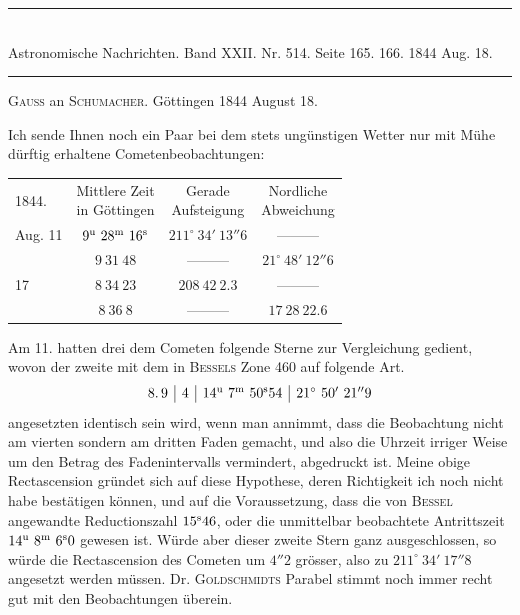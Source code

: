 \clearpage
{}
\hypertarget{native-472-lower}{}
\begin{center}
\rule{0.55\linewidth}{0.4pt}\\[2pt]
Astronomische Nachrichten. Band XXII. Nr. 514. Seite 165. 166. 1844 Aug. 18.\\[2pt]
\rule{0.55\linewidth}{0.4pt}
\end{center}
\begin{center}\textsc{Gauss} an \textsc{Schumacher}. Göttingen 1844 August 18.\end{center}

Ich sende Ihnen noch ein Paar bei dem stets ungünstigen Wetter nur mit Mühe dürftig erhaltene Cometenbeobachtungen:

\begin{center}
\setlength{\tabcolsep}{4pt}
\begin{tabular}{lccc}
1844. & \shortstack{Mittlere Zeit\\in Göttingen} & \shortstack{Gerade\\Aufsteigung} & \shortstack{Nordliche\\Abweichung} \\
Aug. 11 & $9^{\rm u}\ 28^{\rm m}\ 16^{\rm s}$ & $211^\circ\ 34'\ 13''6$ & ---\quad ---\quad --- \\
 & $9\ 31\ 48$ & ---\quad ---\quad --- & $21^\circ\ 48'\ 12''6$ \\
17 & $8\ 34\ 23$ & $208\ 42\ 2.3$ & ---\quad ---\quad --- \\
 & $8\ 36\ 8$ & ---\quad ---\quad --- & $17\ 28\ 22.6$ \\
\end{tabular}
\end{center}

Am 11. hatten drei dem Cometen folgende Sterne zur Vergleichung gedient, wovon der zweite mit dem in \textsc{Bessels} Zone 460 auf folgende Art.
\[
\begin{array}{c|c|c|c}
8.\,9 & 4 & 14^{\rm u}\ 7^{\rm m}\ 50^{\rm s}54 & 21^\circ\ 50'\ 21''9
\end{array}
\]
\noindent angesetzten identisch sein wird, wenn man annimmt, dass die Beobachtung nicht am vierten sondern am dritten Faden gemacht, und also die Uhrzeit irriger Weise um den Betrag des Fadenintervalls vermindert, abgedruckt ist. Meine obige Rectascension gründet sich auf diese Hypothese, deren Richtigkeit ich noch nicht habe bestätigen können, und auf die Voraussetzung, dass die von \textsc{Bessel} angewandte Reductionszahl $15^{\rm s}46$, oder die unmittelbar beobachtete Antrittszeit $14^{\rm u}\ 8^{\rm m}\ 6^{\rm s}0$ gewesen ist. Würde aber dieser zweite Stern ganz ausgeschlossen, so würde die Rectascension des Cometen um $4''2$ grösser, also zu $211^\circ\ 34'\ 17''8$ angesetzt werden müssen. Dr. \textsc{Goldschmidts} Parabel stimmt noch immer recht gut mit den Beobachtungen überein.

